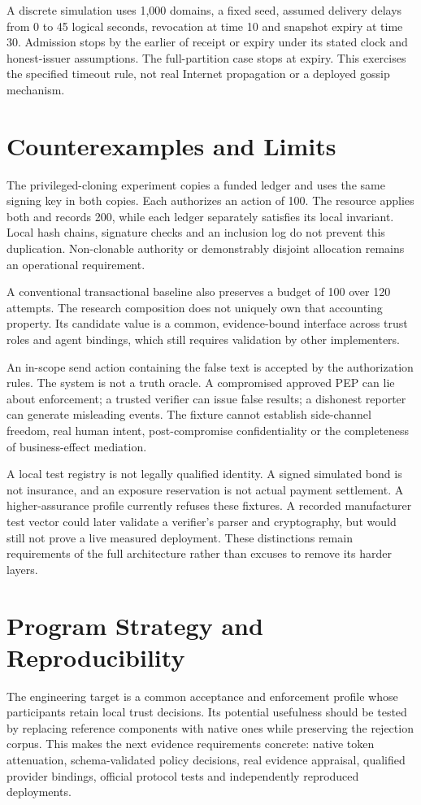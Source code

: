 \documentclass[journal,10pt]{IEEEtran}
\newcommand{\code}[1]{\texttt{\detokenize{#1}}}
\begin{document}
A discrete simulation uses 1,000 domains, a fixed seed, assumed delivery delays from 0 to 45 logical seconds, revocation at time 10 and snapshot expiry at time 30. Admission stops by the earlier of receipt or expiry under its stated clock and honest-issuer assumptions. The full-partition case stops at expiry. This exercises the specified timeout rule, not real Internet propagation or a deployed gossip mechanism.

\section{Counterexamples and Limits}
The privileged-cloning experiment copies a funded ledger and uses the same signing key in both copies. Each authorizes an action of 100. The resource applies both and records 200, while each ledger separately satisfies its local invariant. Local hash chains, signature checks and an inclusion log do not prevent this duplication. Non-clonable authority or demonstrably disjoint allocation remains an operational requirement.

A conventional transactional baseline also preserves a budget of 100 over 120 attempts. The research composition does not uniquely own that accounting property. Its candidate value is a common, evidence-bound interface across trust roles and agent bindings, which still requires validation by other implementers.

An in-scope send action containing the false text \code{2+2=5} is accepted by the authorization rules. The system is not a truth oracle. A compromised approved PEP can lie about enforcement; a trusted verifier can issue false results; a dishonest reporter can generate misleading events. The fixture cannot establish side-channel freedom, real human intent, post-compromise confidentiality or the completeness of business-effect mediation.

A local test registry is not legally qualified identity. A signed simulated bond is not insurance, and an exposure reservation is not actual payment settlement. A higher-assurance profile currently refuses these fixtures. A recorded manufacturer test vector could later validate a verifier's parser and cryptography, but would still not prove a live measured deployment. These distinctions remain requirements of the full architecture rather than excuses to remove its harder layers.

\section{Program Strategy and Reproducibility}
The engineering target is a common acceptance and enforcement profile whose participants retain local trust decisions. Its potential usefulness should be tested by replacing reference components with native ones while preserving the rejection corpus. This makes the next evidence requirements concrete: native token attenuation, schema-validated policy decisions, real evidence appraisal, qualified provider bindings, official protocol tests and independently reproduced deployments.
\end{document}
